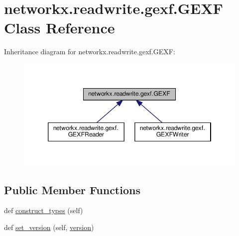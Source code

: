 \hypertarget{classnetworkx_1_1readwrite_1_1gexf_1_1GEXF}{}\section{networkx.\+readwrite.\+gexf.\+G\+E\+XF Class Reference}
\label{classnetworkx_1_1readwrite_1_1gexf_1_1GEXF}


Inheritance diagram for networkx.\+readwrite.\+gexf.\+G\+E\+XF\+:
\nopagebreak
\begin{figure}[H]
\begin{center}
\leavevmode
\includegraphics[width=346pt]{classnetworkx_1_1readwrite_1_1gexf_1_1GEXF__inherit__graph}
\end{center}
\end{figure}
\subsection*{Public Member Functions}
\begin{DoxyCompactItemize}
\item 
def \hyperlink{classnetworkx_1_1readwrite_1_1gexf_1_1GEXF_ae3b9a62b4295f1412adab4617c84672e}{construct\+\_\+types} (self)
\item 
def \hyperlink{classnetworkx_1_1readwrite_1_1gexf_1_1GEXF_ac9af8a88d84f1c50e88f63d8813c958a}{set\+\_\+version} (self, \hyperlink{classnetworkx_1_1readwrite_1_1gexf_1_1GEXF_a3226aabb6dd2080faef052bca59a7a4d}{version})
\end{DoxyCompactItemize}
